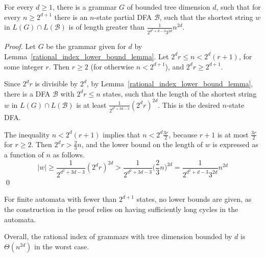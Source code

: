 \documentclass[runningheads]{llncs}
\begin{document}
\begin{theorem}\label{lower_bound_theorem}
For every $d \geqslant 1$,
there is a grammar $G$ of bounded tree dimension $d$,
such that for every $n \geqslant 2^{d+1}$
there is an $n$-state partial DFA $\mathcal{B}$,
such that the shortest string $w$ in $L(G) \cap L(\mathcal{B})$
is of length greater than $\frac{1}{2^{d^2 + d - 3} 3^{2d}} n^{2d}$.
\end{theorem}
\begin{proof}
Let $G$ be the grammar given for $d$ by Lemma~\ref{rational_index_lower_bound_lemma}.
Let $2^d r \leqslant n < 2^d (r+1)$, for some integer $r$.
Then $r \geqslant 2$ (for otherwise $n < 2^{d+1}$),
and $2^d r \geqslant 2^{d+1}$.

Since $2^d r$ is divisible by $2^d$,
by Lemma~\ref{rational_index_lower_bound_lemma},
there is a DFA $\mathcal{B}$ with $2^d r \leqslant n$ states,
such that the length of the shortest string $w$ in $L(G) \cap L(\mathcal{B})$
is at least $\frac{1}{2^{d^2 + 3d - 3}} (2^d r)^{2d}$.
This is the desired $n$-state DFA.


The inequality $n < 2^d (r+1)$ implies that $n < 2^d \frac{3r}{2}$,
because $r+1$ is at most $\frac{3r}{2}$ for $r \geqslant 2$.
Then $2^d r > \frac{2}{3}n$,
and the lower bound on the length of $w$ is expressed as a function of $n$
as follows.
\begin{equation*}
	|w|
		\geqslant
	\frac{1}{2^{d^2 + 3d - 3}} (2^d r)^{2d}
		>
	\frac{1}{2^{d^2 + 3d - 3}} \big(\frac{2}{3} n\big)^{2d}
		=
	\frac{1}{2^{d^2 + d - 3} 3^{2d}} n^{2d}
\end{equation*}
\qed
\end{proof}

For finite automata with fewer than $2^{d+1}$ states,
no lower bounds are given,
as the construction in the proof relies on having sufficiently long cycles in the automata.

Overall,
the rational index of grammars with tree dimension bounded by $d$
is $\Theta(n^{2d})$ in the worst case.

\end{document}
